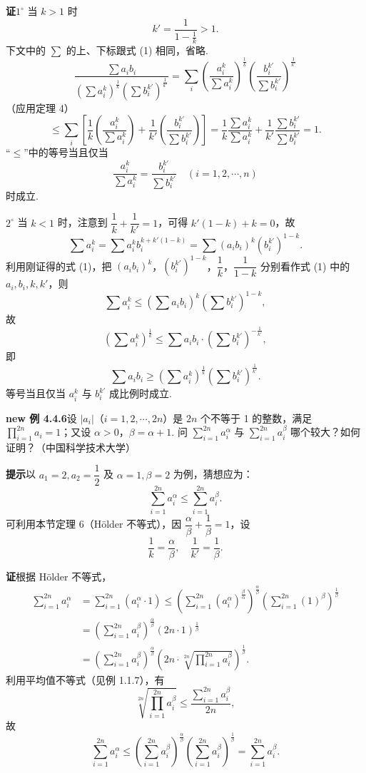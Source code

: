 \documentclass[UTF8,12pt,a4paper,fontset=fandol]{ctexart}
\begin{document}
\noindent\textbf{证}\quad $1^\circ$ 当 $k>1$ 时
\[
k'=\frac1{1-\frac1k}>1.
\]
下文中的 $\sum$ 的上、下标跟式 (1) 相同，省略.
\[
\frac{\sum a_i b_i}{(\sum a_i^k)^{\frac1k}(\sum b_i^{k'})^{\frac1{k'}}}
=\sum_i\left(\frac{a_i^k}{\sum a_i^k}\right)^{\frac1k}
\left(\frac{b_i^{k'}}{\sum b_i^{k'}}\right)^{\frac1{k'}}
\]
（应用定理 4）
\[
\le\sum_i\left[\frac1k\left(\frac{a_i^k}{\sum a_i^k}\right)
+\frac1{k'}\left(\frac{b_i^{k'}}{\sum b_i^{k'}}\right)\right]
=\frac1k\frac{\sum a_i^k}{\sum a_i^k}
+\frac1{k'}\frac{\sum b_i^{k'}}{\sum b_i^{k'}}=1.
\]
“$\le$”中的等号当且仅当
\[
\frac{a_i^k}{\sum a_i^k}=\frac{b_i^{k'}}{\sum b_i^{k'}}
\quad(i=1,2,\cdots,n)
\]
时成立.

$2^\circ$ 当 $k<1$ 时，注意到 $\dfrac1k+\dfrac1{k'}=1$，可得 $k'(1-k)+k=0$，故
\[
\sum a_i^k=\sum a_i^k b_i^{k+k'(1-k)}
=\sum (a_i b_i)^k(b_i^{k'})^{1-k}.
\]
利用刚证得的式 (1)，把 $(a_i b_i)^k$，$(b_i^{k'})^{1-k}$，$\dfrac1k$，$\dfrac1{1-k}$ 分别看作式 (1) 中的 $a_i,b_i,k,k'$，则
\[
\sum a_i^k\le(\sum a_i b_i)^k(\sum b_i^{k'})^{1-k},
\]
故
\[
\left(\sum a_i^k\right)^{\frac1k}
\le \sum a_i b_i\cdot\left(\sum b_i^{k'}\right)^{-\frac1{k'}},
\]
即
\[
\sum a_i b_i\ge
\left(\sum a_i^k\right)^{\frac1k}\left(\sum b_i^{k'}\right)^{\frac1{k'}}.
\]
等号当且仅当 $a_i^k$ 与 $b_i^{k'}$ 成比例时成立.

\noindent\textbf{new 例 4.4.6}\quad 设 $|a_i|$（$i=1,2,\cdots,2n$）是 $2n$ 个不等于 1 的整数，满足
$\displaystyle\prod_{i=1}^{2n}a_i=1$；又设 $\alpha>0$，$\beta=\alpha+1$. 问
$\displaystyle\sum_{i=1}^{2n}a_i^\alpha$ 与
$\displaystyle\sum_{i=1}^{2n}a_i^\beta$ 哪个较大？如何证明？（中国科学技术大学）

\noindent\textbf{提示}\quad 以 $a_1=2,a_2=\dfrac12$ 及 $\alpha=1,\beta=2$ 为例，猜想应为：
\[
\sum_{i=1}^{2n}a_i^\alpha\le\sum_{i=1}^{2n}a_i^\beta.
\]
可利用本节定理 6（Hölder 不等式），因 $\dfrac\alpha\beta+\dfrac1\beta=1$，设
\[
\frac1k=\frac\alpha\beta,\quad \frac1{k'}=\frac1\beta.
\]

\noindent\textbf{证}\quad 根据 Hölder 不等式，
\[
\begin{aligned}
\sum_{i=1}^{2n}a_i^\alpha
&=\sum_{i=1}^{2n}(a_i^\alpha\cdot1)
\le\left(\sum_{i=1}^{2n}(a_i^\alpha)^{\frac\beta\alpha}\right)^{\frac\alpha\beta}
\left(\sum_{i=1}^{2n}(1)^\beta\right)^{\frac1\beta}\\
&=\left(\sum_{i=1}^{2n}a_i^\beta\right)^{\frac\alpha\beta}(2n\cdot1)^{\frac1\beta}\\
&=\left(\sum_{i=1}^{2n}a_i^\beta\right)^{\frac\alpha\beta}
\left(2n\cdot\sqrt[2n]{\prod_{i=1}^{2n}a_i^\beta}\right)^{\frac1\beta}.
\end{aligned}
\]
利用平均值不等式（见例 1.1.7），有
\[
\sqrt[2n]{\prod_{i=1}^{2n}a_i^\beta}\le
\frac{\sum_{i=1}^{2n}a_i^\beta}{2n},
\]
故
\[
\sum_{i=1}^{2n}a_i^\alpha
\le\left(\sum_{i=1}^{2n}a_i^\beta\right)^{\frac\alpha\beta}
\left(\sum_{i=1}^{2n}a_i^\beta\right)^{\frac1\beta}
=\sum_{i=1}^{2n}a_i^\beta.
\]
\end{document}
